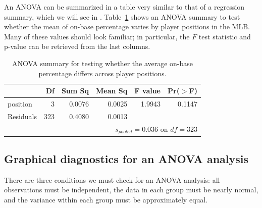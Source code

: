 An ANOVA can be summarized in a table very similar to that of a regression summary, which we will see in . Table~\ref{anovaSummaryTableForOBPAgainstPosition} shows an ANOVA summary to test whether the mean of on-base percentage varies by player positions in the MLB. Many of these values should look familiar; in particular, the $F$ test statistic and p-value can be retrieved from the last columns.

\begin{table}[ht]
\centering
\begin{tabular}{lrrrrr}
  \hline
 & Df & Sum Sq & Mean Sq & F value & Pr($>$F) \\ 
  \hline
position & 3 & 0.0076 & 0.0025 & 1.9943 & 0.1147 \\ 
  Residuals & 323 & 0.4080 & 0.0013 &  &  \\    \hline
\multicolumn{6}{r}{$s_{pooled} = 0.036$ on $df=323$}
\end{tabular}
\caption{ANOVA summary for testing whether the average on-base percentage differs across player positions.}
\label{anovaSummaryTableForOBPAgainstPosition}
\end{table}


\subsection{Graphical diagnostics for an ANOVA analysis}

There are three conditions we must check for an ANOVA analysis: all observations must be independent, the data in each group must be nearly normal, and the variance within each group must be approximately equal.

